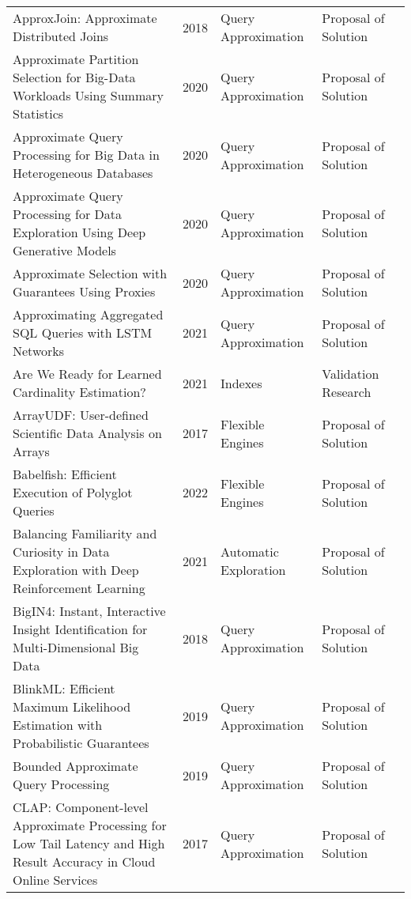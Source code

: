 \begin{longtable}{p{18em} l l l l}
{{ApproxJoin}}: {{Approximate}} Distributed Joins & 2018 & Query Approximation & Proposal of Solution & \cite{quoc_approxjoin_2018}\\ 
Approximate Partition Selection for Big-Data Workloads Using Summary Statistics & 2020 & Query Approximation & Proposal of Solution & \cite{rong_approximate_2020}\\ 
Approximate Query Processing for Big Data in Heterogeneous Databases & 2020 & Query Approximation & Proposal of Solution & \cite{muniswamaiah_approximate_2020}\\ 
Approximate Query Processing for Data Exploration Using Deep Generative Models & 2020 & Query Approximation & Proposal of Solution & \cite{thirumuruganathan_approximate_2020}\\ 
Approximate Selection with Guarantees Using Proxies & 2020 & Query Approximation & Proposal of Solution & \cite{kang_approximate_2020}\\ 
Approximating Aggregated {{SQL}} Queries with {{LSTM}} Networks & 2021 & Query Approximation & Proposal of Solution & \cite{regev_approximating_2021}\\ 
Are We Ready for Learned Cardinality Estimation? & 2021 & Indexes & Validation Research & \cite{wang_are_2021}\\ 
{{ArrayUDF}}: {{User-defined}} Scientific Data Analysis on Arrays & 2017 & Flexible Engines & Proposal of Solution & \cite{dong_arrayudf_2017}\\ 
Babelfish: {{Efficient}} Execution of Polyglot Queries & 2022 & Flexible Engines & Proposal of Solution & \cite{grulich_babelfish_2022}\\ 
Balancing Familiarity and Curiosity in Data Exploration with Deep Reinforcement Learning & 2021 & Automatic Exploration & Proposal of Solution & \cite{personnaz_balancing_2021}\\ 
{{BigIN4}}: {{Instant}}, Interactive Insight Identification for Multi-Dimensional Big Data & 2018 & Query Approximation & Proposal of Solution & \cite{lin_bigin4_2018}\\ 
{{BlinkML}}: {{Efficient}} Maximum Likelihood Estimation with Probabilistic Guarantees & 2019 & Query Approximation & Proposal of Solution & \cite{park_blinkml_2019}\\ 
Bounded Approximate Query Processing & 2019 & Query Approximation & Proposal of Solution & \cite{li_bounded_2019}\\ 
{{CLAP}}: {{Component-level}} Approximate Processing for Low Tail Latency and High Result Accuracy in Cloud Online Services & 2017 & Query Approximation & Proposal of Solution & \cite{han_clap_2017}\\ 

\end{longtable}
